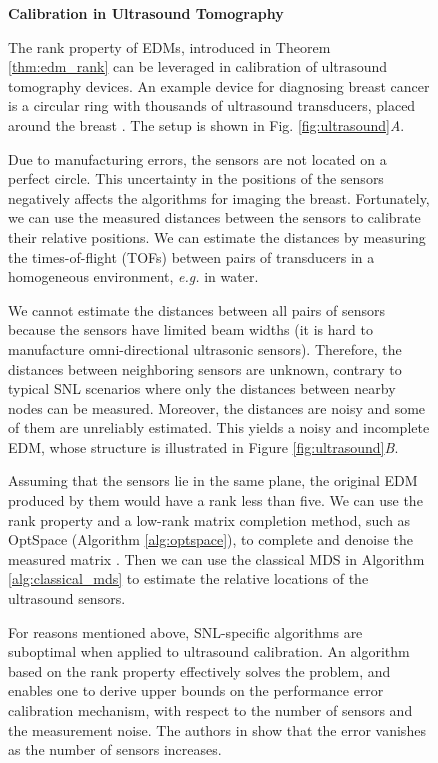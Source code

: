 \documentclass[10pt,double]{IEEEtran}
\begin{document}
\begin{figure*}[t]
\selectfont
\begin{spmagbox}
\textbf{Calibration in Ultrasound Tomography}
\\
\label{sub:calibration}
\fontsize{9pt}{10pt}\selectfont




\begin{multicols}{2}


The rank property of EDMs, introduced in Theorem \ref{thm:edm_rank} can be
leveraged in calibration of ultrasound tomography devices. An example device
for diagnosing breast cancer is a circular ring with thousands of ultrasound
transducers, placed around the breast \cite{dur07}. The setup is shown in Fig.
\ref{fig:ultrasound}\textsl{A}. 

Due to manufacturing errors, the sensors are not located on a perfect circle.
This uncertainty in the positions of the sensors negatively affects the
algorithms for imaging the breast. Fortunately, we can use the measured
distances between the sensors to calibrate their relative positions. We can
estimate the distances by measuring the times-of-flight (TOFs) between pairs
of transducers in a homogeneous environment, \emph{e.g.} in water.

We cannot estimate the distances between all pairs of sensors because the
sensors have limited beam widths (it is hard to manufacture omni-directional
ultrasonic sensors). Therefore, the distances between neighboring sensors are
unknown, contrary to typical SNL scenarios where only the distances between
nearby nodes can be measured. Moreover, the distances are noisy and some of
them are unreliably estimated. This yields a noisy and incomplete EDM, whose
structure is illustrated in Figure
\ref{fig:ultrasound}\textsl{B}. 

Assuming that the sensors lie in the same plane, the original EDM produced by
them would have a rank less than five. We can use the rank property and a
low-rank matrix completion method, such as OptSpace (Algorithm
\ref{alg:optspace}), to complete and denoise the measured matrix
\cite{parhizkar:2013a}. Then we can use the classical MDS in Algorithm
\ref{alg:classical_mds} to estimate the relative locations of the ultrasound
sensors. 

For reasons mentioned above, SNL-specific algorithms are suboptimal when
applied to ultrasound calibration. An algorithm based on the rank property
effectively solves the problem, and enables one to derive upper bounds on the
performance error calibration mechanism, with respect to the number of sensors
and the measurement noise. The authors in \cite{parhizkar:2013a} show that the
error vanishes as the number of sensors increases.


\end{multicols}
\end{spmagbox}
\end{figure*}
\end{document}
